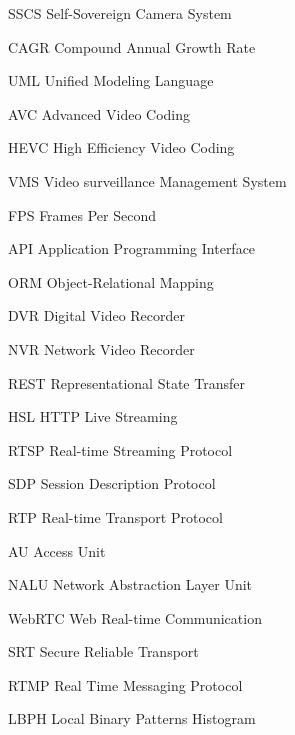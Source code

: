 \documentclass[12pt, %
openright, 
oneside, %
a4paper,    %
brazil]{facom-ufu-abntex2}
\begin{document}
\begin{siglas} %

	\item[SSCS] Self-Sovereign Camera System
	\item[CAGR] Compound Annual Growth Rate
	\item[UML] Unified Modeling Language
	\item[AVC] Advanced Video Coding
	\item[HEVC] High Efficiency Video Coding
	\item[VMS] Video surveillance Management System
	\item[FPS] Frames Per Second
	\item[API] Application Programming Interface
	\item[ORM] Object-Relational Mapping
	\item[DVR] Digital Video Recorder
	\item[NVR] Network Video Recorder
	\item[REST] Representational State Transfer
	\item[HSL] HTTP Live Streaming
	\item[RTSP] Real-time Streaming Protocol
	\item[SDP] Session Description Protocol
	\item[RTP] Real-time Transport Protocol
	\item[AU] Access Unit
	\item[NALU] Network Abstraction Layer Unit
	\item[WebRTC] Web Real-time Communication
	\item[SRT] Secure Reliable Transport
	\item[RTMP] Real Time Messaging Protocol
	\item[LBPH] Local Binary Patterns Histogram

\end{siglas}


\tableofcontents*
\cleardoublepage
\end{document}
